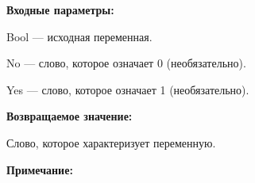 \textbf{Входные параметры:}

Bool --- исходная переменная.
 
	No --- слово, которое означает 0 (необязательно).
 
    Yes --- слово, которое означает 1 (необязательно).

\textbf{Возвращаемое значение:}

Слово, которое характеризует переменную.

\textbf{Примечание:}